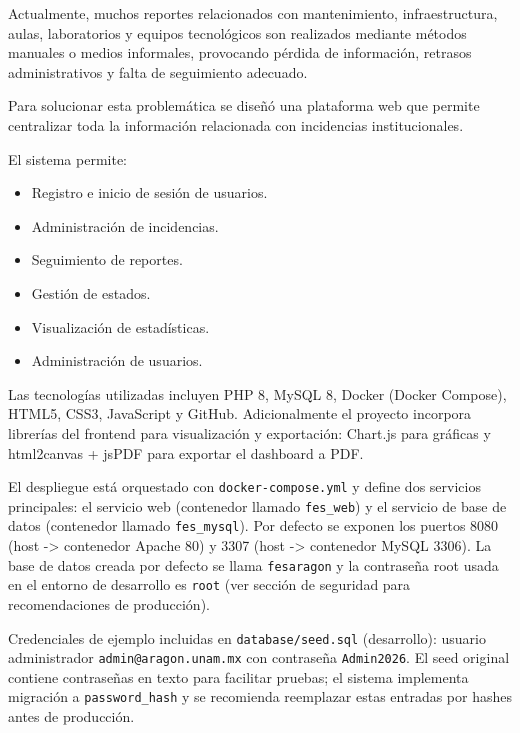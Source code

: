 \documentclass[12pt,letterpaper,oneside]{extreport}
\begin{document}
Actualmente, muchos reportes relacionados con mantenimiento, infraestructura, aulas, laboratorios y equipos tecnológicos son realizados mediante métodos manuales o medios informales, provocando pérdida de información, retrasos administrativos y falta de seguimiento adecuado.

Para solucionar esta problemática se diseñó una plataforma web que permite centralizar toda la información relacionada con incidencias institucionales.

El sistema permite:

\begin{itemize}
    \item Registro e inicio de sesión de usuarios.
    
    \item Administración de incidencias.
    
    \item Seguimiento de reportes.
    
    \item Gestión de estados.
    
    \item Visualización de estadísticas.
    
    \item Administración de usuarios.
\end{itemize}

Las tecnologías utilizadas incluyen PHP 8, MySQL 8, Docker (Docker Compose), HTML5, CSS3, JavaScript y GitHub.
Adicionalmente el proyecto incorpora librerías del frontend para visualización y exportación: Chart.js para gráficas y html2canvas + jsPDF para exportar el dashboard a PDF.

El despliegue está orquestado con \texttt{docker-compose.yml} y define dos servicios principales: el servicio web (contenedor llamado \texttt{fes\_web}) y el servicio de base de datos (contenedor llamado \texttt{fes\_mysql}).
Por defecto se exponen los puertos 8080 (host -> contenedor Apache 80) y 3307 (host -> contenedor MySQL 3306). La base de datos creada por defecto se llama \texttt{fesaragon} y la contraseña root usada en el entorno de desarrollo es \texttt{root} (ver sección de seguridad para recomendaciones de producción).

Credenciales de ejemplo incluidas en \texttt{database/seed.sql} (desarrollo): usuario administrador \texttt{admin@aragon.unam.mx} con contraseña \texttt{Admin2026}. El seed original contiene contraseñas en texto para facilitar pruebas; el sistema implementa migración a \texttt{password\_hash} y se recomienda reemplazar estas entradas por hashes antes de producción.
\end{document}
